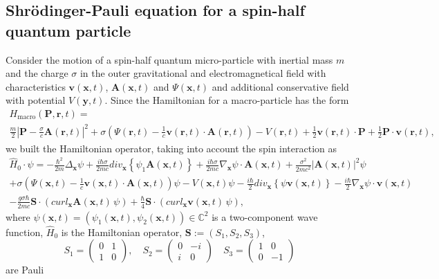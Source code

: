 \documentclass{article}
\theoremstyle{definition}
\theoremstyle{remark}
\renewcommand{\vec}[1]{\mathbf{#1}}
\begin{document}
\subsection{Shr\"{o}dinger-Pauli equation for a spin-half quantum
particle}\label{hjjghjghggh} Consider the motion of a spin-half
quantum micro-particle with inertial mass $m$ and the charge
$\sigma$ in the outer gravitational and electromagnetical field with
characteristics $\vec v(\vec x,t)$, $\vec A(\vec x,t)$ and
$\Psi(\vec x,t)$ and additional conservative field with potential
$V(\vec y,t)$. Since the Hamiltonian for a macro-particle has the
form
\begin{multline}\label{vhfffngghkjgghfjjghghghSYShmyuuiiuuhmhmiopoopnnkkllkkkZZ}
H_{\text{macro}}\left(\vec P,\vec r,t\right)=\\
%
%
%
\frac{m}{2}\left|\vec P-\frac{\sigma}{c}\vec A(\vec r,t)\right|^2
+\sigma\left(\Psi(\vec r,t)-\frac{1}{c}\vec v(\vec r,t)\cdot\vec
A(\vec r,t)\right)-V\left(\vec r,t\right)+\frac{1}{2}\vec v(\vec
r,t)\cdot\vec P+\frac{1}{2}\vec P\cdot\vec v(\vec r,t),
\end{multline}
we built the Hamiltonian operator, taking into account the spin
interaction as
\begin{multline}\label{vhfffngghkjgghfjjghghghSYShmyuuiiuuhmhmiopoopnniukjhjkkkllkkkZZ}
\hat H_0\cdot\psi= -\frac{\hbar^2}{2m}\Delta_{\vec
x}\psi+\frac{i\hbar\sigma}{2mc}div_{\vec x}\left\{\psi_1\vec A(\vec
x,t)\right\}+\frac{i\hbar\sigma}{2mc}\nabla_{\vec x}\psi\cdot\vec
A(\vec x,t)+\frac{\sigma^2}{2mc^2}\left|\vec A(\vec
x,t)\right|^2\psi\\+\sigma\left(\Psi(\vec x,t)-\frac{1}{c}\vec
v(\vec x,t)\cdot\vec A(\vec x,t)\right)\psi-V\left(\vec
x,t\right)\psi-\frac{i\hbar}{2}div_{\vec x}\left\{\psi\vec v(\vec
x,t)\right\}-\frac{i\hbar}{2}\nabla_{\vec x}\psi\cdot\vec v(\vec
x,t)
\\-\frac{g\sigma\hbar}{2mc}\vec
S\cdot\left(curl_{\vec x}\vec A(\vec
x,t)\,\psi\right)+\frac{\hbar}{4}\vec S\cdot\left(curl_{\vec x}\vec
v(\vec x,t)\,\psi\right),
\end{multline}
where $\psi(\vec x,t)=\left(\psi_1(\vec x,t),\psi_2(\vec
x,t)\right)\in\mathbb{C}^2$ is a two-component wave function, $\hat
H_0$ is the Hamiltonian operator, $\vec S:=(S_1,S_2,S_3)$,
$$S_1=\left(\begin{matrix}0&1\\1&0\end{matrix}\right),\quad
S_2=\left(\begin{matrix}0&-i\\i&0\end{matrix}\right)\quad
S_3=\left(\begin{matrix}1&0\\0&-1\end{matrix}\right)$$ are Pauli
\end{document}
